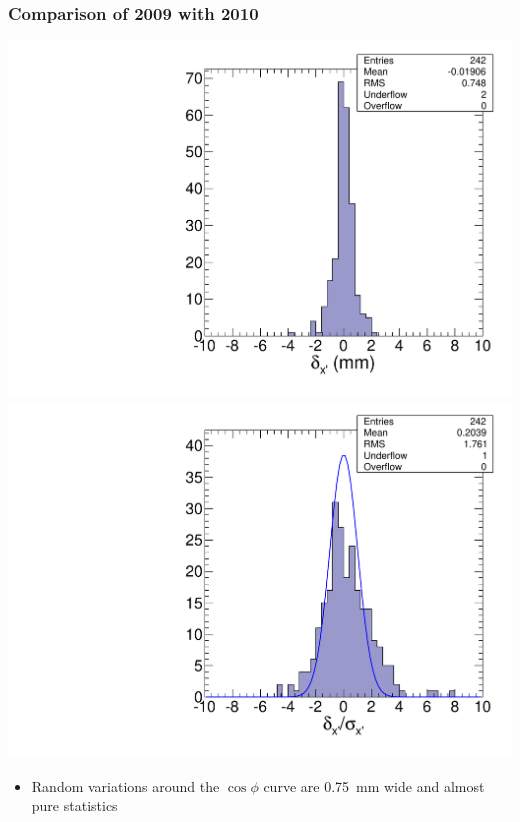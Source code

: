 \documentclass[compress]{beamer}
\begin{document}
\begin{frame}
\frametitle{Comparison of 2009 with 2010}

\includegraphics[width=0.5\linewidth]{craft09_craft10_x_realdiff.pdf} \hfill
\includegraphics[width=0.5\linewidth]{craft09_craft10_x_realdiff_norm.pdf}

\begin{itemize}
\item Random variations around the $\cos\phi$ curve are 0.75~mm wide and almost pure statistics
\end{itemize}
\end{frame}
\end{document}
